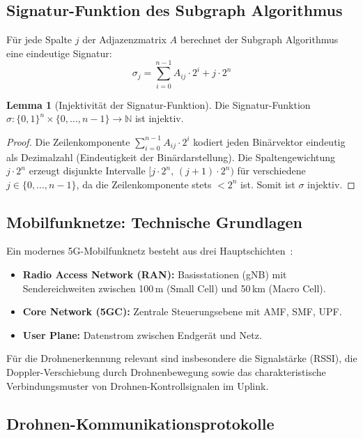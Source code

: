 ﻿\documentclass[a4paper,12pt]{article}
\theoremstyle{definition}
\newtheorem{lemma}{Lemma}
\begin{document}
\subsection{Signatur-Funktion des Subgraph Algorithmus}

F\"ur jede Spalte $j$ der Adjazenzmatrix $A$ berechnet der Subgraph Algorithmus eine
eindeutige Signatur:
\[
\sigma_j = \sum_{i=0}^{n-1} A_{ij} \cdot 2^i + j \cdot 2^n
\]

\begin{lemma}[Injektivit\"at der Signatur-Funktion]
\label{lem:injektiv}
    Die Signatur-Funktion $\sigma: \{0,1\}^n \times \{0,\ldots,n-1\} \to \mathbb{N}$ ist injektiv.
\end{lemma}

\begin{proof}
    Die Zeilenkomponente $\sum_{i=0}^{n-1} A_{ij} \cdot 2^i$ kodiert jeden
    Bin\"arvektor eindeutig als Dezimalzahl (Eindeutigkeit der Bin\"ardarstellung).
    Die Spaltengewichtung $j \cdot 2^n$ erzeugt disjunkte Intervalle
    $[j \cdot 2^n,\, (j+1) \cdot 2^n)$ f\"ur verschiedene $j \in \{0, \ldots, n-1\}$,
    da die Zeilenkomponente stets $< 2^n$ ist. Somit ist $\sigma$ injektiv.
\end{proof}

\subsection{Mobilfunknetze: Technische Grundlagen}

Ein modernes 5G-Mobilfunknetz besteht aus drei Hauptschichten~\cite{3gpp2023}:

\begin{itemize}
    \item \textbf{Radio Access Network (RAN):} Basisstationen (gNB) mit
          Sendereichweiten zwischen 100\,m (Small Cell) und 50\,km (Macro Cell).
    \item \textbf{Core Network (5GC):} Zentrale Steuerungsebene mit AMF, SMF, UPF.
    \item \textbf{User Plane:} Datenstrom zwischen Endger\"at und Netz.
\end{itemize}

F\"ur die Drohnenerkennung relevant sind insbesondere die Signalst\"arke (RSSI),
die Doppler-Verschiebung durch Drohnenbewegung sowie das charakteristische
Verbindungsmuster von Drohnen-Kontrollsignalen im Uplink.

\subsection{Drohnen-Kommunikationsprotokolle}
\end{document}

